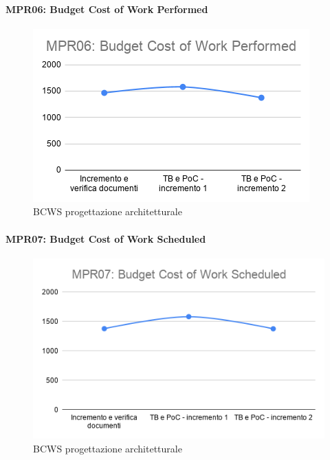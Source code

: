 \paragraph*{MPR06: Budget Cost of Work Performed}
\begin{figure}[ht]
	\centering
	\includegraphics[scale=0.6]{Immagini/BCWP_PArchitetturale.png}
	\caption{BCWS progettazione architetturale}
	\label{fig:BCWP_PArchitetturale}
\end{figure}
\paragraph*{MPR07: Budget Cost of Work Scheduled}
\begin{figure}[ht]
	\centering
	\includegraphics[scale=0.6]{Immagini/BCWS_PArchitetturale.png}
	\caption{BCWS progettazione architetturale}
	\label{fig:BCWS_PArchitetturale}
\end{figure}
